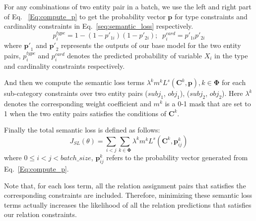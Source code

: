 
For any combinations of two entity pair in a batch, we use the left and right part of Eq. ~\ref{Eq:compute_p} to get the probability vector $\bm{p}$ for type constraints and cardinality constraints in Eq.~\ref{seq:semantic_loss} respectively.
\begin{equation}
\label{Eq:compute_p}
p_{i}^{type} = 1-(1-p'_{1i})(1-p'_{2i});\;\; p_{i}^{card} = p'_{1i}p'_{2i}
\end{equation}
where $\bm{p'}_1$ and $\bm{p'}_2$ represents the outputs of our base model for the two entity pairs,
$p_{i}^{type}$ and $p_{i}^{card}$ denotes the predicted probability of variable $X_i$ in the type and cardinality constraints respectively.

And then we compute the semantic loss terms $\lambda ^{k}m^{k}L^{s}(\bm{C}^{k}, \bm{p}), k \in \bm{\Phi}$ for each sub-category constraints over two entity pairs ($subj_1$, $obj_1$), ($subj_2$, $obj_2$).
Here $\lambda^{k}$ denotes the corresponding weight coefficient and $m^{k}$ is a 0-1 mask that are set to 1 when the two entity pairs satisfies the conditions of $\bm{C}^{k}$.

Finally the total semantic loss is defined as follows:
\begin{equation}
	J_{SL}(\theta) = \sum\limits_{i < j}{\sum_{k\in \bm{\Phi}}{\lambda ^{k}m^{k}L^{s}(\bm{C}^{k}, \bm{p}_{ij}^{k})}}
\end{equation}
where $0\leq i < j < batch\_size$,
$\bm{p}_{ij}^{k} $ refers to the probability vector generated from Eq.~\ref{Eq:compute_p}.

Note that, for each loss term, all the relation assignment pairs that satisfies the corresponding constraints are included.
Therefore, minimizing these semantic loss terms actually increases the likelihood of all the relation predictions that satisfies our relation constraints.

